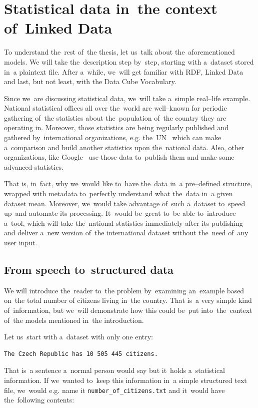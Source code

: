 \chapter{Statistical data in~the context of~Linked Data}
\label{ch:statistical-data}
To understand the~rest of~the thesis, let us~talk about the~aforementioned models.
We will take the~description step by~step, starting with a~dataset stored in~a plaintext file.
After a~while, we~will get familiar with RDF, Linked Data and last, but not least, with the
Data Cube Vocabulary.

Since we~are discussing statistical data, we~will take a~simple real--life example.
National statistical offices all over the~world are well--known for periodic gathering of~the
statistics about the~population of~the country they are operating in. Moreover, 
those statistics are being regularly published and gathered by~international 
organizations, e.g. the~UN~\cite{un} which can make a~comparison and build 
another statistics upon the~national data. Also, other organizations, like 
Google~\cite{pubdata} use those data to~publish them and make 
some advanced statistics.

That is, in~fact, why we~would like to~have the~data in~a pre--defined structure,
wrapped with metadata to~perfectly understand what the~data in~a given 
dataset mean. Moreover, we~would take advantage of~such a~dataset to~speed up~and automate its processing. It~would be~great to~be able to~introduce a~tool, 
which will take the~national statistics immediately after its publishing and 
deliver a~new version of~the international dataset without the~need of~any user 
input.

\section{From speech to~structured data}

We will introduce the~reader to~the problem by~examining an~example based on~the total number of
citizens living in~the country. That is~a very simple kind of~information, but we~will demonstrate
how this could be~put into~the~context of~the models mentioned in~the introduction.

Let us~start with a~dataset with only one entry:

\begin{verbatim}
The Czech Republic has 10 505 445 citizens.
\end{verbatim}

That is~a sentence a~normal person would say but it~holds a~statistical information.
If we~wanted to~keep this information in~a simple structured text file, we~would e.g. name it
\texttt{number\_of\_citizens.txt} and it~would have the~following contents:


